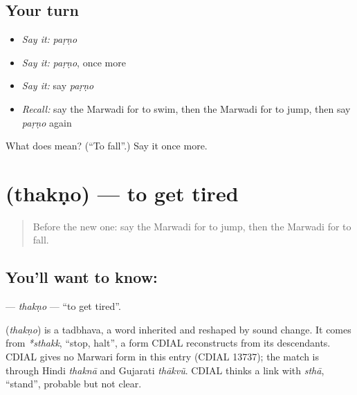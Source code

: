 \subsection*{Your turn}
\begin{itemize}
\raggedright
  \item \emph{Say it:} \emph{paṛṇo}
  \item \emph{Say it:} \emph{paṛṇo}, once more
  \item \emph{Say it:} say \emph{paṛṇo}
  \item \emph{Recall:} say the Marwadi for to swim, then the Marwadi for to jump, then say \emph{paṛṇo} again
\end{itemize}

\begin{tcolorbox}[breakable,colback=teal!4,colframe=teal!35!black,title={Before you move on}]
What does  mean? (\textquotedblleft{}To fall\textquotedblright{}.) Say it once more.
\end{tcolorbox}
\section[\texorpdfstring{\mw{थकणो} (thakṇo)}{थकणो (thakṇo)}]{ (thakṇo) — to get tired}

\label{lesson:MW-C109-thakno}



\begin{quote}
Before the new one: say the Marwadi for to jump, then the Marwadi for to fall.
\end{quote}

\subsection*{You'll want to know: }
\textbf{} — \emph{thakṇo} — \textquotedblleft{}to get tired\textquotedblright{}.

\begin{cousinweb}
\textbf{} (\emph{thakṇo}) is a tadbhava, a word inherited and reshaped by sound change. It comes from \emph{*sthakk}, \textquotedblleft{}stop, halt\textquotedblright{}, a form CDIAL reconstructs from its descendants. CDIAL gives no Marwari form in this entry (CDIAL 13737); the match is through Hindi \emph{thaknā} and Gujarati \emph{thākvũ}. CDIAL thinks a link with \emph{sthā}, \textquotedblleft{}stand\textquotedblright{}, probable but not clear.
\end{cousinweb}

